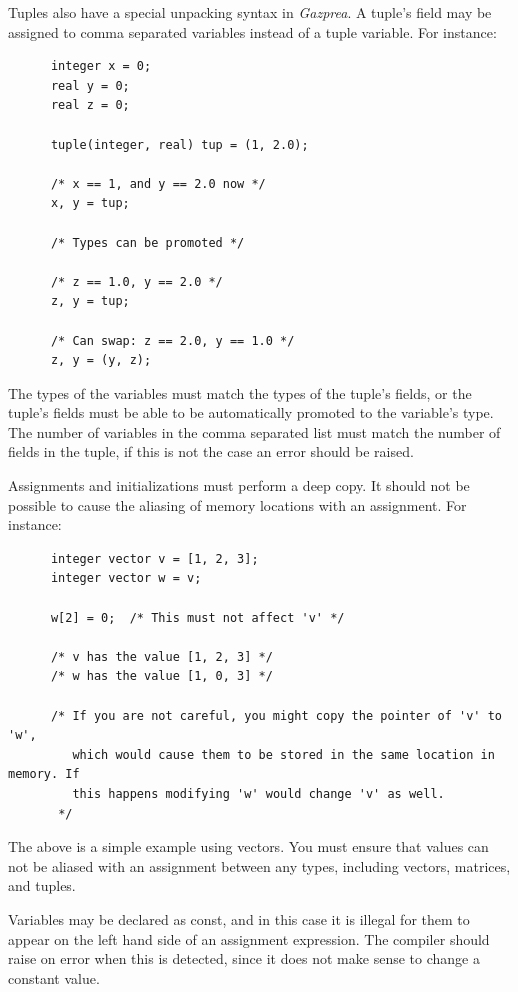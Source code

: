 \documentclass{article}
\begin{document}
    Tuples also have a special unpacking syntax in \textit{Gazprea}. A tuple's field may be assigned to comma
    separated variables instead of a tuple variable. For instance:

    \begin{lstlisting}
      integer x = 0;
      real y = 0;
      real z = 0;

      tuple(integer, real) tup = (1, 2.0);

      /* x == 1, and y == 2.0 now */
      x, y = tup;

      /* Types can be promoted */

      /* z == 1.0, y == 2.0 */
      z, y = tup;

      /* Can swap: z == 2.0, y == 1.0 */
      z, y = (y, z);
    \end{lstlisting}

    The types of the variables must match the types of the tuple's fields, or the tuple's fields must be able to be
    automatically promoted to the variable's type. The number of variables in the comma separated list must match
    the number of fields in the tuple, if this is not the case an error should be raised.

    Assignments and initializations must perform a deep copy. It should not be possible to cause the aliasing of
    memory locations with an assignment. For instance:

    \begin{lstlisting}
      integer vector v = [1, 2, 3];
      integer vector w = v;

      w[2] = 0;  /* This must not affect 'v' */

      /* v has the value [1, 2, 3] */
      /* w has the value [1, 0, 3] */

      /* If you are not careful, you might copy the pointer of 'v' to 'w',
         which would cause them to be stored in the same location in memory. If
         this happens modifying 'w' would change 'v' as well.
       */
    \end{lstlisting}

    The above is a simple example using vectors. You must ensure that values can not be aliased with an assignment
    between any types, including vectors, matrices, and tuples.

    Variables may be declared as const, and in this case it is illegal for them to appear on the left hand side of
    an assignment expression. The compiler should raise on error when this is detected, since it does not make sense
    to change a constant value.
\end{document}
